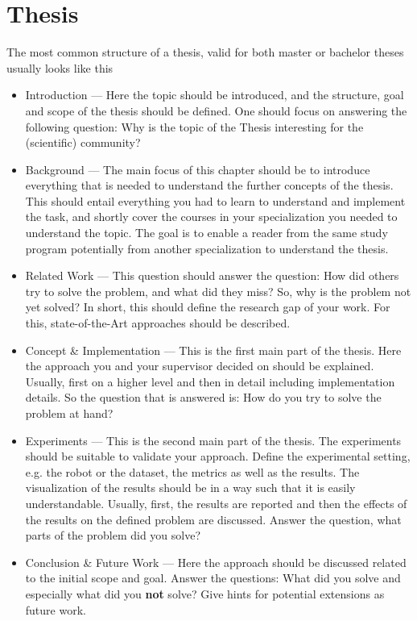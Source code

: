 \section{Thesis}
\label{sec:structure:thesis}
The most common structure of a thesis, valid for both master or bachelor theses usually looks like this
\begin{itemize}
    \item Introduction --- Here the topic should be introduced, and the structure, goal and scope of the thesis should be defined. One should focus on answering the following question: Why is the topic of the Thesis interesting for the (scientific) community?
    \item Background --- The main focus of this chapter should be to introduce everything that is needed to understand the further concepts of the thesis. This should entail everything you had to learn to understand and implement the task, and shortly cover the courses in your specialization you needed to understand the topic. The goal is to enable a reader from the same study program potentially from another specialization to understand the thesis.
    \item Related Work --- This question should answer the question: How did others try to solve the problem, and what did they miss? So, why is the problem not yet solved? In short, this should define the research gap of your work. For this, state-of-the-Art approaches should be described.
    \item Concept \& Implementation --- This is the first main part of the thesis. Here the approach you and your supervisor decided on should be explained. Usually, first on a higher level and then in detail including implementation details. So the question that is answered is: How do you try to solve the problem at hand?
    \item Experiments --- This is the second main part of the thesis. The experiments should be suitable to validate your approach. Define the experimental setting, e.g. the robot or the dataset, the metrics as well as the results. The visualization of the results should be in a way such that it is easily understandable. Usually, first, the results are reported and then the effects of the results on the defined problem are discussed. Answer the question, what parts of the problem did you solve?
    \item Conclusion \& Future Work --- Here the approach should be discussed related to the initial scope and goal. Answer the questions: What did you solve and especially what did you \textbf{not} solve? Give hints for potential extensions as future work.
\end{itemize}

